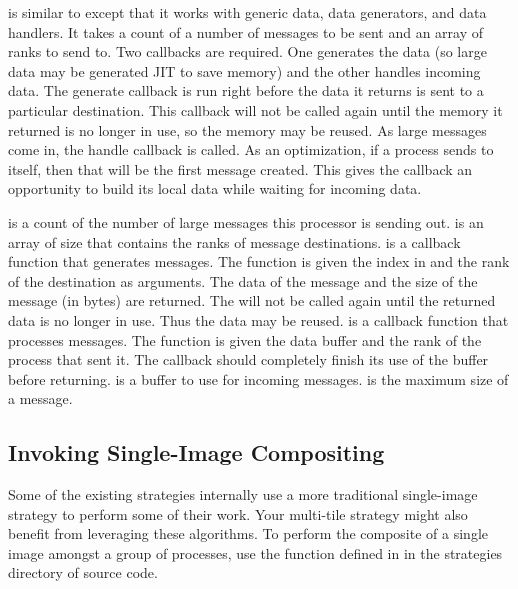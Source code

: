  is similar to
 except that it works with generic
data, data generators, and data handlers.  It takes a count of a number of
messages to be sent and an array of ranks to send to.  Two callbacks are
required.  One generates the data (so large data may be generated JIT to
save memory) and the other handles incoming data.  The generate callback is
run right before the data it returns is sent to a particular destination.
This callback will not be called again until the memory it returned is no
longer in use, so the memory may be reused.  As large messages come in, the
handle callback is called.  As an optimization, if a process sends to
itself, then that will be the first message created.  This gives the
callback an opportunity to build its local data while waiting for incoming
data.

 is a count of the number of large messages this
processor is sending out.   is an array of size
 that contains the ranks of message destinations.
 is a callback function that generates messages.
The function is given the index in  and the rank
of the destination as arguments.  The data of the message and the size of
the message (in bytes) are returned.  The  will not
be called again until the returned data is no longer in use.  Thus the data
may be reused.   is a callback function that processes
messages.  The function is given the data buffer and the rank of the
process that sent it.  The callback should completely finish its use of the
buffer before returning.   is a buffer to use for
incoming messages.   is the maximum size of a message.

\subsection{Invoking Single-Image Compositing}

Some of the existing \IceT strategies internally use a more traditional
single-image strategy to perform some of their work.  Your multi-tile
strategy might also benefit from leveraging these algorithms.  To perform
the composite of a single image amongst a group of processes, use the
 function defined in
 in the strategies directory of \IceT
source code.

